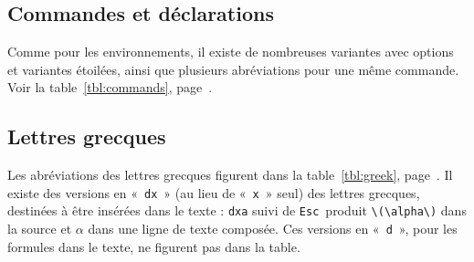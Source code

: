 \documentclass[11pt]{article}
\newcommand{\esckey}{\texttt{Esc}}
\begin{document}
\subsection*{Commandes et déclarations}

Comme pour les environnements, il existe de nombreuses variantes avec options et variantes étoilées, ainsi que plusieurs abréviations pour une même commande. Voir la table~\ref{tbl:commands}, page~\pageref{tbl:commands}.

\subsection*{Lettres grecques}

Les abréviations des lettres grecques figurent dans la table~\ref{tbl:greek}, page~\pageref{tbl:greek}. Il existe des versions en «~\texttt{dx}~» (au lieu de «~\texttt{x}~» seul) des lettres grecques, destinées à être insérées dans le texte : \texttt{dxa} suivi de \esckey\ produit \verb'\(\alpha\)' dans la source et \(\alpha\) dans une ligne de texte composée. Ces versions en «~\texttt{d}~», pour les formules dans le texte, ne figurent pas dans la table.
\end{document}
